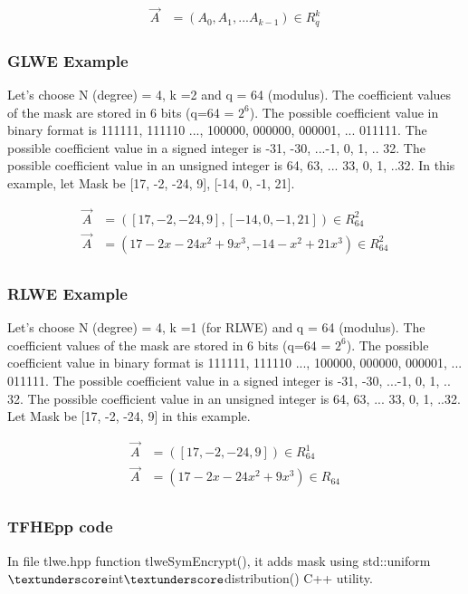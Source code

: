 \documentclass{techrep}
\theoremstyle{definition}
\theoremstyle{plain}
\begin{document}
	\begin{align*}
		\overrightarrow{A} &= (A_0,A_1,...A_{k-1}) \in R_q^k
	\end{align*}

\subsubsection{GLWE Example}

Let’s choose N (degree) = 4, k =2 and q = 64 (modulus). The coefficient values of the mask are stored in 6 bits (q=64 = $2^6$). The possible coefficient value in binary format is {111111, 111110 ..., 100000, 000000, 000001, ... 011111}. The possible coefficient value in a signed integer is {-31, -30, ...-1, 0, 1, .. 32}. The possible coefficient value in an unsigned integer is {64, 63, ... 33, 0, 1, ..32}. In this example, let Mask be [17, -2, -24, 9], [-14, 0, -1, 21].

\begin{align*} 
\overrightarrow{A} &= ([17, -2, -24, 9], [-14, 0, -1, 21]) \in R_{64}^2 \\ 
\overrightarrow{A} &= (17-2x -24x^2 +9x^3,-14-x^2+21x^3) \in R_{64}^2 \\ 
\end{align*}

\subsubsection{RLWE Example}

Let’s choose N (degree) = 4, k =1 (for RLWE) and q = 64 (modulus). The coefficient values of the mask are stored in 6 bits (q=64 = $2^6$). The possible coefficient value in binary format is {111111, 111110 ..., 100000, 000000, 000001, ... 011111}. The possible coefficient value in a signed integer is {-31, -30, ...-1, 0, 1, .. 32}. The possible coefficient value in an unsigned integer is {64, 63, ... 33, 0, 1, ..32}. Let Mask be [17, -2, -24, 9] in this example.

\begin{align*} 
\overrightarrow{A} &= ([17, -2, -24, 9]) \in R_{64}^1 \\ 
\overrightarrow{A} &= (17-2x -24x^2 +9x^3) \in R_{64} \\ 
\end{align*}

\subsubsection{TFHEpp code}
In file tlwe.hpp function tlweSymEncrypt(), it adds mask using std::uniform$\textunderscore$int$\textunderscore$distribution() C++ utility. 
\end{document}
